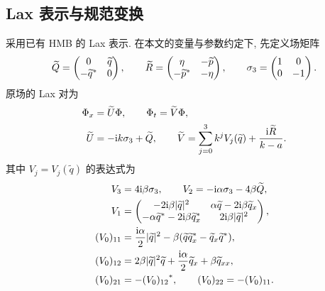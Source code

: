 \subsection{Lax 表示与规范变换}
采用已有 HMB 的 Lax 表示\cite{LHP2013}. 在本文的变量与参数约定下, 先定义场矩阵
\begin{equation}\label{eq:potential-matrices}
\widetilde Q=\begin{pmatrix}0&\widetilde q\\-{\widetilde q}^{*}&0\end{pmatrix},\qquad
\widetilde R=\begin{pmatrix}\eta&-\widetilde p\\-{\widetilde p}^{*}&-\eta\end{pmatrix},\qquad
\sigma_3=\begin{pmatrix}1&0\\0&-1\end{pmatrix}.
\end{equation}
原场的 Lax 对为
\begin{equation}\label{eq:lax}
\begin{aligned}
\Phi_x&=\widetilde U\Phi,\qquad \Phi_t=\widetilde V\Phi,\\
\widetilde U&=-\mathrm{i} k\sigma_3+\widetilde Q,\qquad
\widetilde V=\sum\limits_{j=0}^{3}k^jV_j(\widetilde q)+\dfrac{\mathrm{i} \widetilde R}{k-a}.
\end{aligned}
\end{equation}
其中 $V_j=V_j(\widetilde q)$ 的表达式为
\begin{align}
V_3&=4\mathrm{i}\beta\sigma_3,\qquad V_2=-\mathrm{i}\alpha\sigma_3-4\beta \widetilde Q,\label{eq:V32}\\
V_1&=\begin{pmatrix}
-2\mathrm{i}\beta|\widetilde q|^2&\alpha \widetilde q-2\mathrm{i}\beta \widetilde q_x\\
-\alpha{\widetilde q}^{*}-2\mathrm{i}\beta{\widetilde q_x}^{*}&2\mathrm{i}\beta|\widetilde q|^2
\end{pmatrix},\label{eq:V1}\\
(V_0)_{11}&=\dfrac{\mathrm{i}\alpha}{2}|\widetilde q|^2-\beta(\widetilde q{\widetilde q_x}^{*}-\widetilde q_x{\widetilde q}^{*}),\label{eq:V0}\\
(V_0)_{12}&=2\beta|\widetilde q|^2\widetilde q+\dfrac{\mathrm{i}\alpha}{2}\widetilde q_x+\beta \widetilde q_{xx},\nonumber\\
(V_0)_{21}&=-{(V_0)_{12}}^{*},\qquad (V_0)_{22}=-(V_0)_{11}.\nonumber
\end{align}

